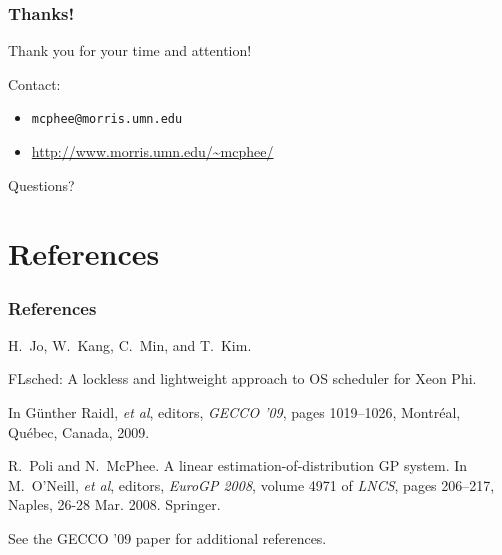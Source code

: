 \documentclass{beamer}
\newcommand{\linespace}{\vskip 0.25cm}
\begin{document}
\begin{frame}
\frametitle{Thanks!}

Thank you for your time and attention!
	
\linespace
\linespace

Contact:  
\begin{itemize}
	\item \texttt{mcphee@morris.umn.edu}
	\item \url{http://www.morris.umn.edu/~mcphee/}
\end{itemize}

\linespace
\linespace

\begin{center}
{\huge Questions?}
\end{center}
\end{frame}

\section*{References}

\begin{frame} 
\frametitle{References} 

\begin{thebibliography}{lskdjf}

H.~Jo, W.~Kang, C.~Min, and T.~Kim.

\newblock FLsched: A lockless and lightweight approach to OS scheduler for Xeon Phi.

\newblock In G\"unther Raidl, \emph{et al}, editors, {\em GECCO '09}, pages 1019--1026, Montr\'eal, Qu\'ebec, Canada, 2009.

R.~Poli and N.~McPhee.
\newblock A linear estimation-of-distribution {GP} system.
\newblock In M.~O'Neill, \emph{et al}, editors, {\em EuroGP 2008}, volume
  4971 of {\em LNCS}, pages 206--217, Naples,
  26-28 Mar. 2008. Springer.
  
\end{thebibliography}

\linespace
\begin{center}
	See the GECCO '09 paper for additional references.
	\end{center}
\end{frame} 
\end{document}
